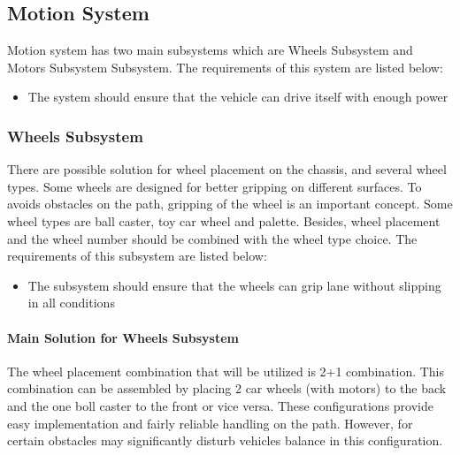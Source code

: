 \documentclass[a4paper,12pt]{article}
\begin{document}
	
	\subsection{Motion System}
	
	Motion system has two main subsystems which are Wheels Subsystem and Motors Subsystem Subsystem. The requirements of this system are listed below:
	\begin{itemize}
		\item The system should	ensure that the vehicle can drive itself with enough power
	\end{itemize}
	
	
	
	\subsubsection{Wheels Subsystem}
	There are possible solution for wheel placement on the chassis, and several wheel types. Some wheels are designed for better gripping on different surfaces. To avoids obstacles on the path, gripping of the wheel is an important concept. Some wheel types are ball caster, toy car wheel and palette. Besides, wheel placement and the wheel number should be combined with the wheel type choice. The requirements of this subsystem are listed below:
	\begin{itemize}
		\item The subsystem should ensure that the wheels can grip lane without slipping in all conditions 	
	\end{itemize}
	
	\paragraph{Main Solution for Wheels Subsystem}
	
	The wheel placement combination that will be utilized is 2+1 combination. This combination can be assembled by placing 2 car wheels (with motors) to the back and the one boll caster to the front or vice versa. These configurations provide easy implementation and fairly reliable handling on the path. However, for certain obstacles may significantly disturb vehicles balance in this configuration.\\
	
\end{document}
